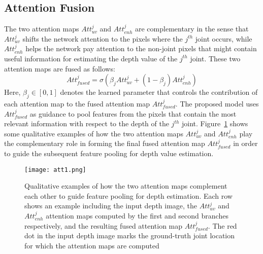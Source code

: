 \documentclass{article}
\begin{document}
\subsection{Attention Fusion}
The two attention maps $Att_{uv}^j$ and $Att_{enh}^j$ are complementary in the sense that $Att_{uv}^j$ shifts the network attention to the pixels where the $j^{th}$ joint occurs, while $Att_{enh}^j$ helps the network pay attention to the non-joint pixels that might contain useful information for estimating the depth value of the $j^{th}$ joint. These two attention maps are fused as follows:
\begin{equation}
  Att_{fused}^j = \sigma(\beta_j Att_{uv}^j + (1 - \beta_j)Att_{enh}^j)
\end{equation}
Here, $\beta_j \in{[0,1]}$ denotes the learned parameter that controls the contribution of each attention map to the fused attention map $Att_{fused}^j$. The proposed model uses $Att_{fused}^j$ as guidance to pool features from the pixels that contain the most relevant information with respect to the depth of the $j^{th}$ joint. Figure~\ref{fig:attention} shows some qualitative examples of how the two attention maps $Att_{uv}^j$ and $Att_{enh}^j$ play the complementary role in forming the final fused attention map $Att_{fused}^j$ in order to guide the subsequent feature pooling for depth value estimation.


\begin{figure}[t]
\centering
\texttt{[image: att1.png]}
\caption{Qualitative examples of how the two attention maps complement each other to guide feature pooling for depth estimation. Each row shows an example including the input depth image, the $Att_{uv}^j$ and $Att_{enh}^j$ attention maps computed by the first and second branches respectively, and the resulting fused attention map $Att_{fused}^j$. The red dot in the input depth image marks the ground-truth joint location for which the attention maps are computed}
\label{fig:attention}
\end{figure}
\end{document}
